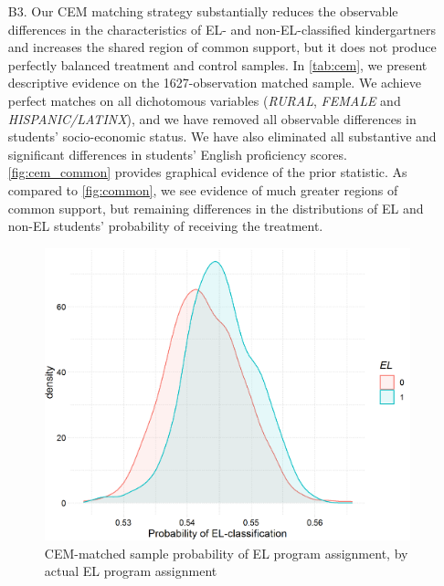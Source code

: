 \documentclass[a4paper, 11pt]{article}
\begin{document}
\begin{enumerate}
	\item[B3.] Our CEM matching strategy substantially reduces the observable differences in the characteristics of EL- and non-EL-classified kindergartners and increases the shared region of common support, but it does not produce perfectly balanced treatment and control samples. In \autoref{tab:cem}, we present descriptive evidence on the 1627-observation matched sample. We achieve perfect matches on all dichotomous variables (\textit{RURAL}, \textit{FEMALE} and \textit{HISPANIC/LATINX}), and we have removed all observable differences in students' socio-economic status. We have also eliminated all substantive and significant differences in students' English proficiency scores. \autoref{fig:cem_common} provides graphical evidence of the prior statistic. As compared to \autoref{fig:common}, we see evidence of much greater regions of common support, but remaining differences in the distributions of EL and non-EL students' probability of receiving the treatment.

	

	\begin{figure}
		\begin{center}
			\includegraphics[scale=0.7]{figures/cem1_common_support.png}
			\caption{CEM-matched sample probability of EL program assignment, by actual EL program assignment} \label{fig:cem_common}
		\end{center}
	\end{figure}


\end{enumerate}
\end{document}
